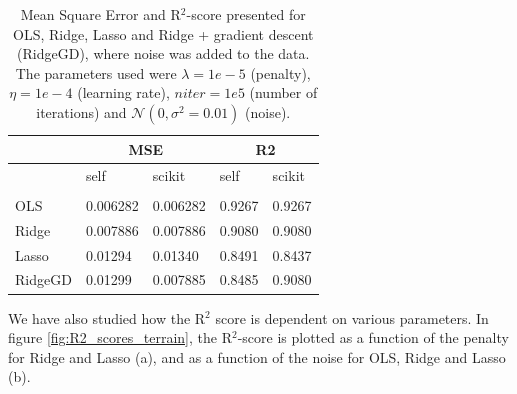 \begin{table} [H]
	\caption{Mean Square Error and R$^2$-score presented for OLS, Ridge, Lasso and Ridge + gradient descent (RidgeGD), where noise was added to the data. The parameters used were $\lambda=1e-5$ (penalty), $\eta=1e-4$ (learning rate), $niter=1e5$ (number of iterations) and $\mathcal{N}(0, \sigma^2=0.01)$ (noise). \vspace{2mm}}
	\begin{tabularx}{\textwidth}{l|XX|XX} \hline\hline
		\label{tab:terrain_error}
		& \multicolumn{2}{c}{\textbf{MSE}}&\multicolumn{2}{c}{\textbf{R2}}\\ \hline
		&self&scikit&self&scikit\\ \hline \\
		OLS & 0.006282 & 0.006282 & 0.9267 & 0.9267\\
		Ridge & 0.007886 & 0.007886 & 0.9080 & 0.9080 \\
		Lasso & 0.01294 & 0.01340 & 0.8491 & 0.8437 \\
		RidgeGD & 0.01299 & 0.007885 & 0.8485 & 0.9080 \\ \hline
	\end{tabularx}
\end{table}

We have also studied how the R$^2$ score is dependent on various parameters. In figure \eqref{fig:R2_scores_terrain}, the R$^2$-score is plotted as a function of the penalty for Ridge and Lasso (a), and as a function of the noise for OLS, Ridge and Lasso (b).


